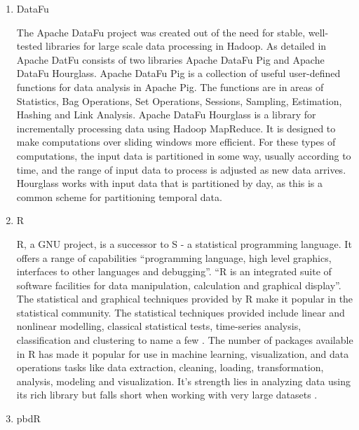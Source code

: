 \begin{enumerate}
\item {} 
DataFu

The Apache DataFu project was created out of the need for stable,
well-tested libraries for large scale data processing in Hadoop.
As detailed in \label{\detokenize{i524/technologies:id70}}{\hyperref[\detokenize{i524/technologies:www-datafu}]{\sphinxcrossref{{[}61{]}}}} Apache DatFu consists of two
libraries Apache DataFu Pig and Apache DataFu Hourglass.  Apache
DataFu Pig is a collection of useful user-defined functions for
data analysis in Apache Pig. The functions are in areas of
Statistics, Bag Operations, Set Operations, Sessions, Sampling,
Estimation, Hashing and Link Analysis.  Apache DataFu Hourglass is
a library for incrementally processing data using Hadoop
MapReduce. It is designed to make computations over sliding windows
more efficient. For these types of computations, the input data is
partitioned in some way, usually according to time, and the range
of input data to process is adjusted as new data arrives.
Hourglass works with input data that is partitioned by day, as
this is a common scheme for partitioning temporal data.

\item {} 
R

R, a GNU project, is a successor to S - a statistical programming
language. It offers a range of capabilities \textendash{} “programming
language, high level graphics, interfaces to other languages and
debugging”. ``R is an integrated suite of software facilities for
data manipulation, calculation and graphical display''. The
statistical and graphical techniques provided by R make it popular
in the statistical community. The statistical techniques provided
include linear and nonlinear modelling, classical statistical
tests, time-series analysis, classification and clustering to name
a few \label{\detokenize{i524/technologies:id71}}{\hyperref[\detokenize{i524/technologies:www-r}]{\sphinxcrossref{{[}62{]}}}}. The number of packages available in R has
made it popular for use in machine learning, visualization, and
data operations tasks like data extraction, cleaning, loading,
transformation, analysis, modeling and visualization. It's
strength lies in analyzing data using its rich library but falls
short when working with very large datasets \label{\detokenize{i524/technologies:id72}}{\hyperref[\detokenize{i524/technologies:book-r}]{\sphinxcrossref{{[}63{]}}}}.

\item {} 
pbdR


\end{enumerate}
